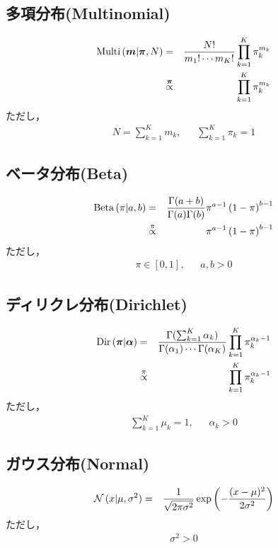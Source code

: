 \documentclass[a4j]{jarticle}
\begin{document}
\subsection{多項分布(Multinomial)}
\begin{eqnarray}
\operatorname{\rm Multi}{( \boldsymbol{m} | \boldsymbol{\pi}, N )} &=& \frac{N!}{m_1! \cdots m_K!}\prod_{k=1}^{K}{\pi_k^{m_k}} \label{Multinomial}\\
&\overset{\boldsymbol{\pi}}{\propto}& \prod_{k=1}^{K}{\pi_k^{m_k}}
\end{eqnarray}
ただし，
\begin{eqnarray*}
N = \sum_{k=1}^{K}{m_k},~~~~~~~\sum_{k=1}^{K}{\pi_k} = 1
\end{eqnarray*}

\subsection{ベータ分布(Beta)}
\begin{eqnarray}
\operatorname{\rm Beta}{(\pi | a, b)} &=& \frac{\Gamma(a + b)}{\Gamma(a)\Gamma(b)} \pi^{a-1}\left( 1 - \pi\right)^{b-1} \label{Beta} \\
&\overset{\pi}{\propto}& \pi^{a-1}\left( 1 - \pi\right)^{b-1}
\end{eqnarray}
ただし，
\begin{eqnarray*}
\pi \in [0,1],~~~~~~~a, b > 0
\end{eqnarray*}

\subsection{ディリクレ分布(Dirichlet)}
\begin{eqnarray}
\operatorname{\rm Dir}{(\boldsymbol{\pi} | \boldsymbol{\alpha})} &=& \frac{\Gamma(\sum_{k=1}^{K}{\alpha_k})}{\Gamma(\alpha_1)\cdots\Gamma(\alpha_K)} \prod_{k=1}^{K}{\pi_k^{\alpha_k-1}} \label{Dirichlet} \\
&\overset{\pi}{\propto}& \prod_{k=1}^{K}{\pi_k^{\alpha_k-1}}
\end{eqnarray}
ただし，
\begin{eqnarray*}
\sum_{k=1}^{K}{\mu_k} = 1,~~~~~~~\alpha_k > 0
\end{eqnarray*}

\subsection{ガウス分布(Normal)}
\begin{eqnarray}
\operatorname{\mathcal{N}}{(x | \mu, \sigma^2)} &=& \frac{1}{\sqrt{2 \pi \sigma^2}} \exp{\left( -\frac{(x - \mu)^2}{2\sigma^2}\right)} \label{Normal}
\end{eqnarray}
ただし，
\begin{eqnarray*}
\sigma^2 > 0
\end{eqnarray*}
\end{document}

